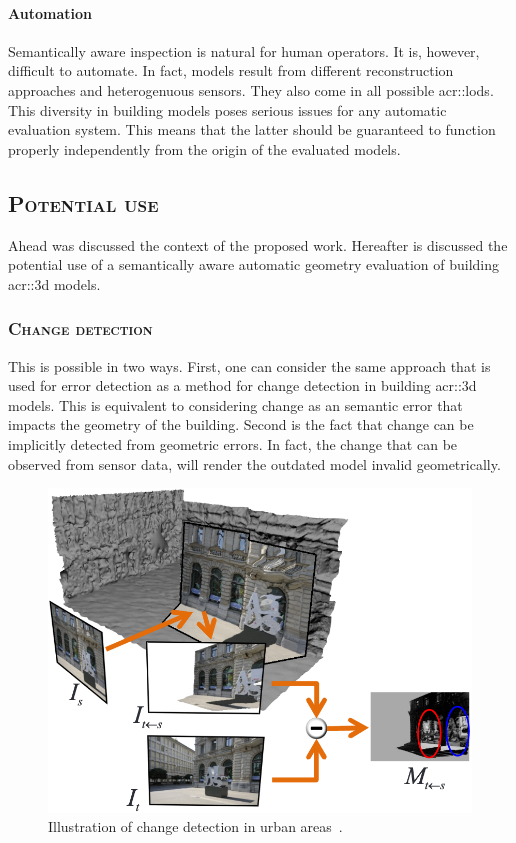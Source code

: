         \paragraph{Automation}
            Semantically aware inspection is natural for human operators.
            It is, however, difficult to automate.
            In fact, models result from different reconstruction approaches and heterogenuous sensors.
            They also come in all possible \glspl{acr::lod}.
            This diversity in building models poses serious issues for any automatic evaluation system.
            This means that the latter should be guaranteed to function properly independently from the origin of the evaluated models.

    \subsection{\textsc{Potential use}}
        \label{subsec::introduction::contributions::use}
        Ahead was discussed the context of the proposed work.
        Hereafter is discussed the potential use of a semantically aware automatic geometry evaluation of building \gls{acr::3d} models.
        \subsubsection{\textsc{Change detection}}
            This is possible in two ways.
            First, one can consider the same approach that is used for error detection as a method for change detection in building \gls{acr::3d} models.
            This is equivalent to considering change as an semantic error that impacts the geometry of the building.
            Second is the fact that change can be implicitly detected from geometric errors.
            In fact, the change that can be observed from sensor data, will render the outdated model invalid geometrically.
            \begin{figure}[htpb]
                \centering
                \includegraphics[width=.7\textwidth]{images/introduction/use/change_detection_taneja}
                \caption{\label{fig::3d_change_detection} Illustration of change detection in urban areas~\parencite{taneja2013city}.}
            \end{figure}


